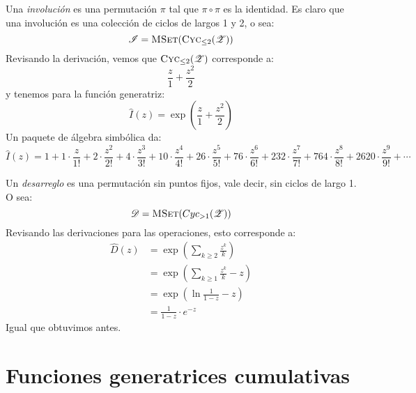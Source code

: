   Una \emph{involución} es una permutación \(\pi\)
  tal que \(\pi \circ \pi\) es la identidad.
  Es claro que una involución
  es una colección de ciclos de largos \num{1} y \num{2},
  o sea:
  \begin{equation*}
    \mathscr{I}
      = \operatorname{\textsc{MSet}}(\operatorname{\textsc{Cyc}}_{\le 2}(\mathscr{Z}))
  \end{equation*}
  Revisando la derivación,
  vemos que \(\operatorname{\textsc{Cyc}}_{\le 2}(\mathscr{Z})\) corresponde a:
  \begin{equation*}
    \frac{z}{1} + \frac{z^2}{2}
  \end{equation*}
  y tenemos para la función generatriz:
  \begin{equation*}
    \widehat{I}(z)
      = \exp\left( \frac{z}{1} + \frac{z^2}{2} \right)
  \end{equation*}
  Un paquete de álgebra simbólica da:
  \begin{equation*}
    \widehat{I}(z)
      = 1 +    1 \cdot \frac{z}{1!}
          +    2 \cdot \frac{z^2}{2!}
          +    4 \cdot \frac{z^3}{3!}
          +   10 \cdot \frac{z^4}{4!}
          +   26 \cdot \frac{z^5}{5!}
          +   76 \cdot \frac{z^6}{6!}
          +  232 \cdot \frac{z^7}{7!}
          +  764 \cdot \frac{z^8}{8!}
          + 2620 \cdot \frac{z^9}{9!}
          + \dotsm
  \end{equation*}

  Un \emph{desarreglo} es una permutación sin puntos fijos,
  vale decir,
  sin ciclos de largo \num{1}.
  O sea:
  \begin{equation*}
    \mathscr{D}
      = \operatorname{\textsc{MSet}}(Cyc_{> 1}(\mathscr{Z}))
  \end{equation*}
  Revisando las derivaciones para las operaciones,
  esto corresponde a:
  \begin{align*}
    \widehat{D}(z)
      &= \exp \left( \sum_{k \ge 2} \frac{z^k}{k} \right) \\
      &= \exp \left( \sum_{k \ge 1} \frac{z^k}{k} - z \right) \\
      &= \exp \left( \ln \frac{1}{1 - z} - z \right) \\
      &= \frac{1}{1 - z} \cdot e^{-z}
  \end{align*}
  Igual que obtuvimos antes.

\section{Funciones generatrices cumulativas}
\label{sec:gf-cumulativa}

